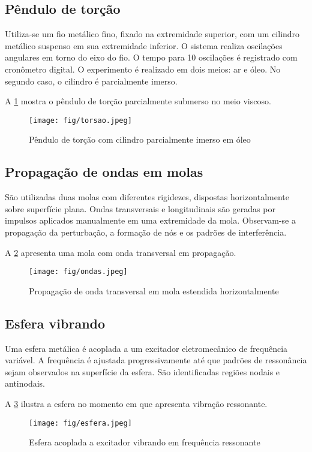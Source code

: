 \subsection{Pêndulo de torção}

Utiliza-se um fio metálico fino, fixado na extremidade superior, com um cilindro metálico suspenso em sua extremidade inferior. O sistema realiza oscilações angulares em torno do eixo do fio. O tempo para 10 oscilações é registrado com cronômetro digital. O experimento é realizado em dois meios: ar e óleo. No segundo caso, o cilindro é parcialmente imerso.

A \cref{fig:torsao} mostra o pêndulo de torção parcialmente submerso no meio viscoso.

\begin{figure}[H]
    \centering
    \texttt{[image: fig/torsao.jpeg]}
    \caption{Pêndulo de torção com cilindro parcialmente imerso em óleo}
    \label{fig:torsao}
\end{figure}

\subsection{Propagação de ondas em molas}

São utilizadas duas molas com diferentes rigidezes, dispostas horizontalmente sobre superfície plana. Ondas transversais e longitudinais são geradas por impulsos aplicados manualmente em uma extremidade da mola. Observam-se a propagação da perturbação, a formação de nós e os padrões de interferência.

A \cref{fig:ondas} apresenta uma mola com onda transversal em propagação.

\begin{figure}[H]
    \centering
    \texttt{[image: fig/ondas.jpeg]}
    \caption{Propagação de onda transversal em mola estendida horizontalmente}
    \label{fig:ondas}
\end{figure}

\subsection{Esfera vibrando}

Uma esfera metálica é acoplada a um excitador eletromecânico de frequência variável. A frequência é ajustada progressivamente até que padrões de ressonância sejam observados na superfície da esfera. São identificadas regiões nodais e antinodais.

A \cref{fig:esfera} ilustra a esfera no momento em que apresenta vibração ressonante.

\begin{figure}[H]
    \centering
    \texttt{[image: fig/esfera.jpeg]}
    \caption{Esfera acoplada a excitador vibrando em frequência ressonante}
    \label{fig:esfera}
\end{figure}
